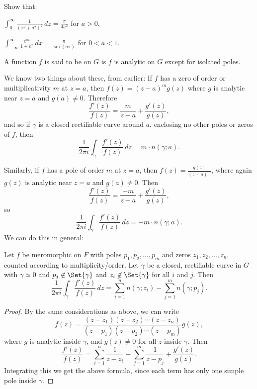\begin{exercise}
	Show that:
	\begin{parts}
		\item $\displaystyle \int_0^\infty \frac{1}{(x^2 + a^2)^2} \, d z = \frac{\pi}{4 a^3}$ for $a > 0$,
		\item $\displaystyle \int_{-\infty}^\infty \frac{e^{a x}}{1 + e^x} \, d x = \frac{\pi}{\sin(a \pi)}$ for $0 < a < 1$. \qedhere
	\end{parts}
\end{exercise}


\begin{definition}[Meromorphic]
	A function $f$ is said to be  on $G$ is $f$ is analytic on $G$ except for isolated poles.
\end{definition}

We know two things about these, from earlier:
If $f$ has a zero of order or multiplicativity $m$ at $z = a$, then $f(z) = (z - a)^m g(z)$ where $g$ is analytic near $z = a$ and $g(a) \neq 0$.
Therefore
\[
	\frac{f'(z)}{f(z)} = \frac{m}{z - a} + \frac{g'(z)}{g(z)},
\]
and so if $\gamma$ is a closed rectifiable curve around $a$, enclosing no other poles or zeros of $f$, then
\[
	\frac{1}{2 \pi i} \int_\gamma \frac{f'(z)}{f(z)} \, d z = m \cdot n(\gamma; a).
\]

Similarly, if $f$ has a pole of order $m$ at $z = a$, then $f(z) = \frac{g(z)}{(z - a)^m}$, where again $g(z)$ is analytic near $z = a$ and $g(a) \neq 0$.
Then
\[
	\frac{f'(z)}{f(z)} = \frac{- m}{z - a} + \frac{g'(z)}{g(z)},
\]
so
\[
	\frac{1}{2 \pi i} \int_\gamma \frac{f'(z)}{f(z)} \, d z = - m \cdot n(\gamma; a).
\]
We can do this in general:

\begin{theorem}\label{thm5.7}
	Let $f$ be meromorphic on $F$ with poles $p_1, p_2, \dots, p_m$ and zeros $z_1, z_2, \dots, z_n$, counted according to multiplicity/order.
	Let $\gamma$ be a closed, rectifiable curve in $G$ with $\gamma \simeq 0$ and $p_j \not\in \Set{\gamma}$ and $z_i \not\in \Set{\gamma}$ for all $i$ and $j$.
	Then
	\[
		\frac{1}{2 \pi i} \int_\gamma \frac{f'(z)}{f(z)} \, d z = \sum_{i = 1}^n n(\gamma; z_i) - \sum_{j = 1}^m n(\gamma; p_j).
	\]
\end{theorem}

\begin{proof}
	By the same considerations as above, we can write
	\[
		f(z) = \frac{(z - z_1) (z - z_2) \dotsm (z - z_n)}{(z - p_1) (z - p_2) \dotsm (z - p_m)} g(z),
	\]
	where $g$ is analytic inside $\gamma$, and $g(z) \neq 0$ for all $z$ inside $\gamma$.
	Then
	\[
		\frac{f'(z)}{f(z)} = \sum_{i = 1}^n \frac{1}{z - z_i} - \sum_{j = 1}^m \frac{1}{z - p_j} + \frac{g'(z)}{g(z)}.
	\]
	Integrating this we get the above formula, since each term has only one simple pole inside $\gamma$.
\end{proof}

